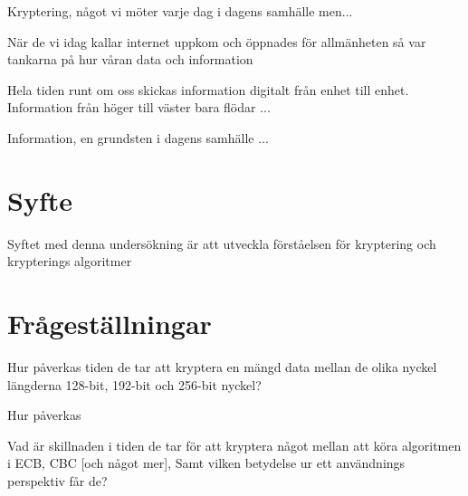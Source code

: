 
Kryptering, något vi möter varje dag i dagens samhälle men...

När de vi idag kallar internet uppkom och öppnades för allmänheten så var tankarna på hur
våran data och information

Hela tiden runt om oss skickas information digitalt från enhet till enhet. Information från
höger till väster bara flödar ...

Information, en grundsten i dagens samhälle ...

\section{Syfte}
Syftet med denna undersökning är att utveckla förståelsen för kryptering och krypterings
algoritmer


\section{Frågeställningar}
Hur påverkas tiden de tar att kryptera en mängd data mellan de olika nyckel längderna 128-bit,
192-bit och 256-bit nyckel?

Hur påverkas 

Vad är skillnaden i tiden de tar för att kryptera något mellan att köra algoritmen i ECB, CBC
[och något mer], Samt vilken betydelse ur ett användnings perspektiv får de?
